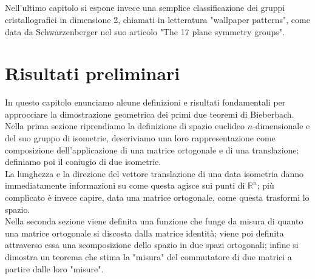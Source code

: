 \documentclass[a4paper,11pt,openright,twoside	]{book}
\begin{document}
\paragraph{}
Nell'ultimo capitolo si espone invece una semplice classificazione dei gruppi cristallografici in dimensione 2, chiamati in letteratura "wallpaper patterns", come data da Schwarzenberger nel suo articolo "The 17 plane symmetry groups". 


\chapter{Risultati preliminari}
In questo capitolo enunciamo alcune definizioni e risultati fondamentali per approcciare la dimostrazione geometrica dei primi due teoremi di Bieberbach.  \\

Nella prima sezione riprendiamo la definizione di spazio euclideo $n$-dimensionale e del suo gruppo di isometrie, descriviamo una loro rappresentazione come composizione dell'applicazione di una matrice ortogonale e di una translazione; definiamo poi il coniugio di due isometrie. \\
La lunghezza e la direzione del vettore translazione di una data isometria danno immediatamente informazioni su come questa agisce sui punti di $\mathbb{R}^n$; più complicato è invece capire, data una matrice ortogonale, come questa trasformi lo spazio. \\
Nella seconda sezione viene definita una funzione che funge da misura di quanto una matrice ortogonale si discosta dalla matrice identità; viene poi definita attraverso essa una scomposizione dello spazio in due spazi ortogonali; infine si dimostra un teorema che stima la "misura" del commutatore di due matrici a partire dalle loro "misure".  
\end{document}
